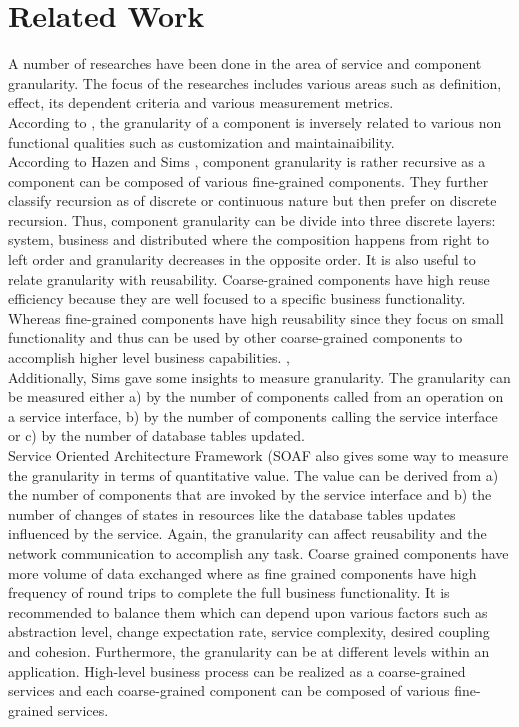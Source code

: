 \section{Related Work}\label{section:granularity/relatedwork}

A number of researches have been done in the area of service and component granularity. The focus of the researches includes various areas such as definition, effect, its dependent criteria and various measurement metrics.
\\
According to \cite{Padmal-Vitharana:2004aa}, the granularity of a component is inversely related to various non functional qualities such as customization and maintainaibility.
\\
According to Hazen and Sims \cite{Peter-Herzum:2000aa}, component granularity is rather recursive as a component can be composed of various fine-grained components. They further classify recursion as of discrete or continuous nature but then prefer on discrete recursion. Thus, component granularity can be divide into three discrete layers: system, business and distributed where the composition happens from right to left order and granularity decreases in the opposite order.
It is also useful to relate granularity with reusability. Coarse-grained components have high reuse efficiency because they are well focused to a specific business functionality. Whereas fine-grained components have high reusability since they focus on small functionality and thus can be used by other coarse-grained components to accomplish higher level business capabilities. \cite{Hafedh-Mili:2001aa}, \cite{Zhongjie-Wang:2005aa}
\\
Additionally, Sims \cite{Sims:2005aa} gave some insights to measure granularity. The granularity can be measured either a) by the number of components called from an operation on a service interface, b) by the number of components calling the service interface or c) by the number of database tables updated.
\\
Service Oriented Architecture Framework (\acrshort{SOAF} \cite{Abdelkarim-Erradi:2006aa} also gives some way to measure the granularity in terms of quantitative value. The value can be derived from a) the number of components that are invoked by the service interface and b) the number of changes of states in resources like the database tables updates influenced by the service. Again, the granularity can affect reusability and the network communication to accomplish any task. Coarse grained components have more volume of data exchanged where as fine grained components have high frequency of round trips to complete the full business functionality. It is recommended to balance them which can depend upon various factors such as abstraction level, change expectation rate, service complexity, desired coupling and cohesion. Furthermore, the granularity can be at different levels within an application. High-level business process can be realized as a coarse-grained services and each coarse-grained component can be composed of various fine-grained services.
